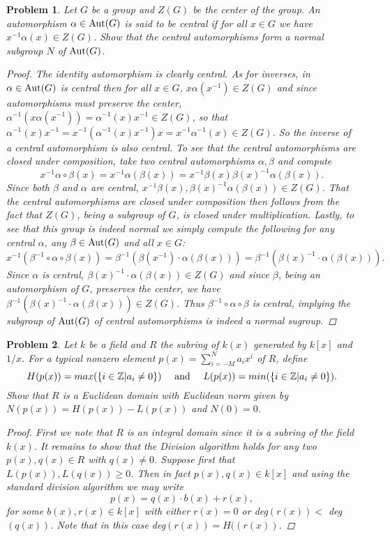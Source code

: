 \documentclass[11pt]{article}
\newcommand{\Z}{\mathbb{Z}}
\newcommand{\1}{\textbf{1}}
\newtheorem{prob}{Problem}
\begin{document}
\begin{prob}
Let $G$ be a group and $Z(G)$ be the center of the group. An automorphism $\alpha\in\textnormal{Aut}(G)$ is said to be central if for all $x\in G$ we have $x^{-1}\alpha(x)\in Z(G)$. Show that the central automorphisms form a normal subgroup $N$ of $\textnormal{Aut}(G)$.

\begin{proof}
The identity automorphism is clearly central. As for inverses, in $\alpha\in\textnormal{Aut}(G)$ is central then for all $x\in G$, $x\alpha(x^{-1})\in Z(G)$ and since automorphisms must preserve the center, $\alpha^{-1}(x\alpha(x^{-1})) = \alpha^{-1}(x) x^{-1}\in Z(G)$, so that $\alpha^{-1}(x)x^{-1} = x^{-1}(\alpha^{-1}(x) x^{-1})x =x^{-1}\alpha^{-1}(x) \in Z(G)$. So the inverse of a central automorphism is also central. To see that the central automorphisms are closed under composition, take two central automorphisms $\alpha, \beta$ and compute \[x^{-1} \alpha\circ\beta (x) = x^{-1}\alpha(\beta(x)) = x^{-1}\beta(x)\beta(x)^{-1}\alpha(\beta(x)). \] Since both $\beta$ and $\alpha$ are central, $x^{-1}\beta(x), \beta(x)^{-1}\alpha(\beta(x))\in Z(G)$. That the central automorphisms are closed under composition then follows from the fact that $Z(G)$, being a subgroup of $G$, is closed under multiplication. Lastly, to see that this group is indeed normal we simply compute the following for any central $\alpha$, any $\beta\in\textnormal{Aut}(G)$ and all $x\in G$: \[x^{-1}(\beta^{-1}\circ\alpha\circ\beta(x)) = \beta^{-1}(\beta(x^{-1})\cdot\alpha(\beta(x))) = \beta^{-1}(\beta(x)^{-1}\cdot\alpha(\beta(x))).\] Since $\alpha$ is central, $\beta(x)^{-1}\cdot\alpha(\beta(x))\in Z(G)$ and since $\beta$, being an automorphism of $G$, preserves the center, we have $\beta^{-1}(\beta(x)^{-1}\cdot\alpha(\beta(x)))\in Z(G)$. Thus $\beta^{-1}\circ\alpha\circ\beta$ is central, implying the subgroup of $\textnormal{Aut}(G)$ of central automorphisms is indeed a normal sugroup. 

\end{proof}
\end{prob}

\begin{prob}
Let $k$ be a field and $R$ the subring of $k(x)$ generated by $k[x]$ and $1/x$. For a typical nonzero element $p(x) = \sum_{i = -M}^N a_i x^i$ of $R$, define \[H(p(x)) = max(\{ i\in\Z| a_i\neq 0\})\quad \textnormal{ and }\quad L(p(x)) = min(\{i\in\Z | a_i\neq 0\}).\] Show that $R$ is a Euclidean domain with Euclidean norm given by $N(p(x)) = H(p(x)) - L(p(x))$ and $N(0) = 0$.

\begin{proof}
First we note that $R$ is an integral domain since it is a subring of the field $k(x)$. It remains to show that the Division algorithm holds for any two $p(x), q(x)\in R$ with $q(x)\neq 0$. Suppose first that $L(p(x)), L(q(x))\geq 0$. Then in fact $p(x), q(x) \in k[x]$ and using the standard division algorithm we may write \[p(x) = q(x)\cdot b(x)  + r(x),\] for some $b(x),r(x)\in k[x]$ with either $r(x) = 0$ or deg$(r(x)) <$ deg$(q(x))$. Note that in this case deg$(r(x)) = H((r(x))$. 
\end{proof}
\end{prob}
\end{document}
